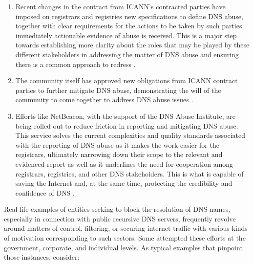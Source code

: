\begin{enumerate}
  \item Recent changes in the contract from ICANN's contracted parties have imposed on registrars and registries new specifications to define DNS abuse, together with clear requirements for the actions to be taken by such parties immediately actionable evidence of abuse is received. This is a major step towards establishing more clarity about the roles that may be played by these different stakeholders in addressing the matter of DNS abuse and ensuring there is a common approach to redress \cite{Weinstein2023}.
  \item The community itself has approved new obligations from ICANN contract parties to further mitigate DNS abuse, demonstrating the will of the community to come together to address DNS abuse issues \cite{ICANN2023}.
  \item Efforts like NetBeacon, with the support of the DNS Abuse Institute, are being rolled out to reduce friction in reporting and mitigating DNS abuse. This service solves the current complexities and quality standards associated with the reporting of DNS abuse as it makes the work easier for the registrars, ultimately narrowing down their scope to the relevant and evidenced report as well as it underlines the need for cooperation among registrars, registries, and other DNS stakeholders. This is what is capable of saving the Internet and, at the same time, protecting the credibility and confidence of DNS \cite{NetBeacon}.
  
\end{enumerate}

Real-life examples of entities seeking to block the resolution of DNS names, especially in connection with public recursive DNS servers, frequently revolve around matters of control, filtering, or securing internet traffic with various kinds of motivation corresponding to such sectors. Some attempted these efforts at the government, corporate, and individual levels. As typical examples that pinpoint those instances, consider:


